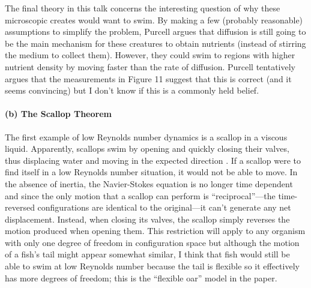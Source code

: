 \documentclass[12pt]{article}
\begin{document}
The final theory in this talk concerns the interesting question of why these
microscopic creates would want to swim.
By making a few (probably reasonable) assumptions to simplify the problem,
Purcell argues that diffusion is still going to be the main mechanism for
these creatures to obtain nutrients (instead of stirring the medium to collect
them).
However, they could swim to regions with higher nutrient density by moving
faster than the rate of diffusion.
Purcell tentatively argues that the measurements in Figure 11 suggest that
this is correct (and it seems convincing) but I don't know if this is a
commonly held belief.


\paragraph{(b) The Scallop Theorem}

The first example of low Reynolds number dynamics is a scallop in a viscous
liquid.
Apparently, scallops swim by opening and quickly closing their valves, thus
displacing water and moving in the expected direction \cite{scallop}.
If a scallop were to find itself in a low Reynolds number situation, it would
not be able to move.
In the absence of inertia, the Navier-Stokes equation is no longer time
dependent and since the only motion that a scallop can perform is
``reciprocal''---the time-reversed configurations are identical to the
original---it can't generate any net displacement.
Instead, when closing its valves, the scallop simply reverses the motion
produced when opening them.
This restriction will apply to any organism with only one degree of freedom in
configuration space but although the motion of a fish's tail might appear
somewhat similar, I think that fish would still be able to swim at low
Reynolds number because the tail is flexible so it effectively has more
degrees of freedom; this is the ``flexible oar'' model in the paper.


{}

\end{document}
